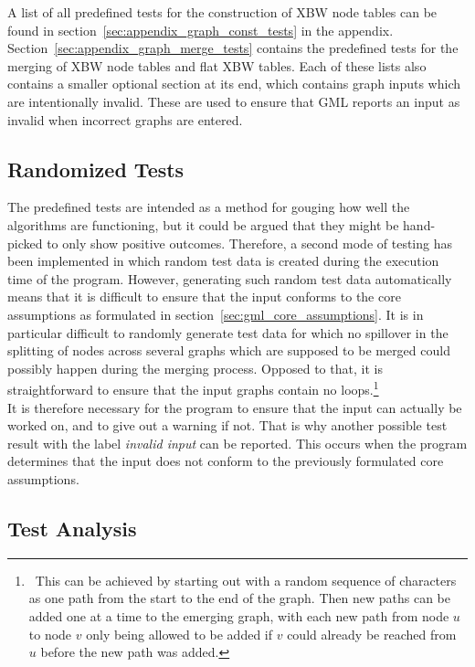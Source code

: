 \documentclass[a4paper,12pt,twoside,BCOR=10mm]{scrbook}
\begin{document}
A list of all predefined tests for the construction of XBW node tables can be found 
in section~\ref{sec:appendix_graph_const_tests} in the appendix. 
Section~\ref{sec:appendix_graph_merge_tests} contains the predefined tests for 
the merging of XBW node tables and flat XBW tables. 
Each of these lists also contains a smaller optional section at its end, 
which contains graph inputs which are intentionally invalid. These are used 
to ensure that GML reports an input as invalid when incorrect graphs are entered. 

\subsection{Randomized Tests}

The predefined tests are intended as a method for gouging how well the algorithms 
are functioning, but it could be argued that they might be hand-picked 
to only show positive outcomes. 
Therefore, a second mode of testing has been implemented 
in which random test data is created during the execution time of the program. 
However, generating such random test data automatically means 
that it is difficult to ensure that the input conforms 
to the core assumptions as formulated in section~\ref{sec:gml_core_assumptions}. 
It is in particular difficult to randomly generate test data for which 
no spillover in the splitting of nodes across several graphs which are 
supposed to be merged could possibly happen during the merging process. 
Opposed to that, it is straightforward to ensure that the input graphs 
contain no loops.\footnote{\,\,\,This can be achieved by starting out with a 
random sequence of characters as one path from the start to the end 
of the graph. 
Then new paths can be added one at a time to the emerging 
graph, with each new path from node $ u $ to node $ v $ only being 
allowed to be added if $ v $ could already be reached from $ u $ before 
the new path was added.} \\
It is therefore necessary for the program to ensure that the 
input can actually be worked on, and to give out a warning if not. 
That is why another possible test result with the label \textit{invalid input} can be reported. 
This occurs when the program determines that the input does not conform 
to the previously formulated core assumptions. 

\subsection{Test Analysis}
\end{document}
